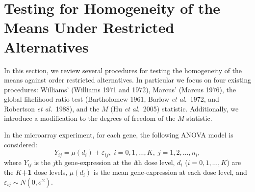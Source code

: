 \documentclass[10pt]{article}
\newcommand{\markchapter}[1]{\markboth{
   \mbox{}\hfill {\it Chapter \thechapter}. \ {\it #1}  \hfill  \mbox{}\hspace{-\textwidth} \protect\rule[-2mm]{\textwidth}{.15mm}}{}}
\begin{document}

\section{Testing for Homogeneity of the Means Under Restricted
Alternatives} \label{sec: testing}

In this section, we review several procedures for testing the
homogeneity of the means against order restricted alternatives. In
particular we focus on four existing procedures: Williams' (Williams
1971 and 1972), Marcus' (Marcus 1976), the global likelihood ratio
test (Bartholomew 1961, Barlow \textit{et al.}\ 1972, and Robertson
\textit{et al.}\ 1988), and the $M$ (Hu \textit{et al.}\ 2005)
statistic. Additionally, we introduce a modification to the degrees
of freedom of the $M$ statistic.

In the microarray experiment, for each gene, the following ANOVA
model is considered:
\begin{equation}
\label{themodel} Y_{ij}=\mu(d_{i})+\varepsilon_{ij},\;i=0,1,\dots,
K,\;j=1,2, \dots, n_i,
\end{equation}
where $Y_{ij}$ is the $j$th gene-expression at the \textit{i}th dose
level, $d_{i}$ ($i=0,1,\dots, K$) are the \textbf{$K$+1} dose
levels, $\mu(d_{i})$ is the mean gene-expression at each dose level,
and $\varepsilon_{ij} \sim N(0,\sigma^{2})$.
\end{document}
